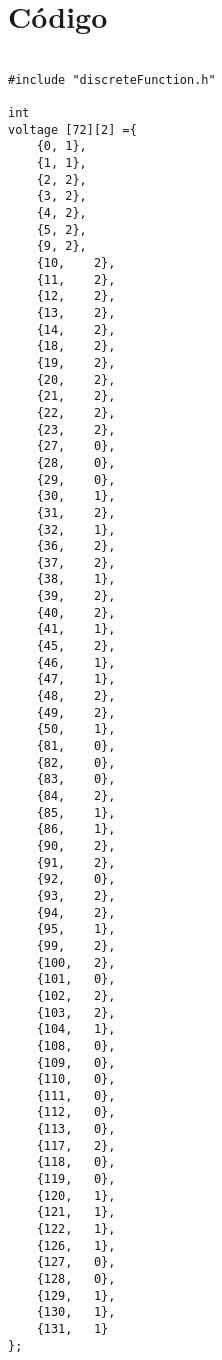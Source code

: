 \chapter{Código}\label{ch:appendix}

\begin{lstlisting}[caption=Modelo discreto de la vía de señalización. Implementación en C]

#include "discreteFunction.h"

int
voltage [72][2] ={
	{0,	1},
	{1,	1},
	{2,	2},
	{3,	2},
	{4,	2},
	{5,	2},
	{9,	2},
	{10,	2},
	{11,	2},
	{12,	2},
	{13,	2},
	{14,	2},
	{18,	2},
	{19,	2},
	{20,	2},
	{21,	2},
	{22,	2},
	{23,	2},
	{27,	0},
	{28,	0},
	{29,	0},
	{30,	1},
	{31,	2},
	{32,	1},
	{36,	2},
	{37,	2},
	{38,	1},
	{39,	2},
	{40,	2},
	{41,	1},
	{45,	2},
	{46,	1},
	{47,	1},
	{48,	2},
	{49,	2},
	{50,	1},
	{81,	0},
	{82,	0},
	{83,	0},
	{84,	2},
	{85,	1},
	{86,	1},
	{90,	2},
	{91,	2},
	{92,	0},
	{93,	2},
	{94,	2},
	{95,	1},
	{99,	2},
	{100,	2},
	{101,	0},
	{102,	2},
	{103,	2},
	{104,	1},
	{108,	0},
	{109,	0},
	{110,	0},
	{111,	0},
	{112,	0},
	{113,	0},
	{117,	2},
	{118,	0},
	{119,	0},
	{120,	1},
	{121,	1},
	{122,	1},
	{126,	1},
	{127,	0},
	{128,	0},
	{129,	1},
	{130,	1},
	{131,	1}
};


\end{lstlisting}
